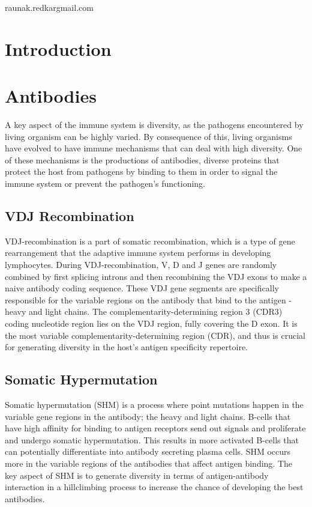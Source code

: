 \documentclass[times, twoside, watermark]{zHenriquesLab-StyleBioRxiv}
\begin{document}
\begin{corrauthor}
raunak.redkar\at gmail.com
\end{corrauthor}

\section*{Introduction}

\section*{Antibodies}
A key aspect of the immune system is diversity, as the pathogens encountered by living organism can be highly varied. By consequence of this, living organisms have evolved to have immune mechanisms that can deal with high diversity. One of these mechanisms is the productions of antibodies, diverse proteins that protect the host from pathogens by binding to them in order to signal the immune system or prevent the pathogen's functioning.

\subsection*{VDJ Recombination}
VDJ-recombination is a part of somatic recombination, which is a type of gene rearrangement that the adaptive immune system performs in developing lymphocytes. During VDJ-recombination, V, D and J genes are randomly combined by first splicing introns and then recombining the VDJ exons to make a naive antibody coding sequence. These VDJ gene segments are specifically responsible for the variable regions on the antibody that bind to the antigen - heavy and light chains. The complementarity-determining region 3 (CDR3) coding nucleotide region lies on the VDJ region, fully covering the D exon. It is the most variable complementarity-determining region (CDR), and thus is crucial for generating diversity in the host's antigen specificity repertoire. \cite{vdjRecombination} 


\subsection*{Somatic Hypermutation}
Somatic hypermutation (SHM) is a process where point mutations happen in the variable gene regions in the antibody; the heavy and light chains. B-cells that have high affinity for binding to antigen receptors send out signals and proliferate and undergo somatic hypermutation. This results in more activated B-cells that can potentially differentiate into antibody secreting plasma cells. SHM occurs more in the variable regions of the antibodies that affect antigen binding. The key aspect of SHM is to generate diversity in terms of antigen-antibody interaction in a hillclimbing process to increase the chance of developing the best antibodies. \cite{vdjRecombination} 
\end{document}
